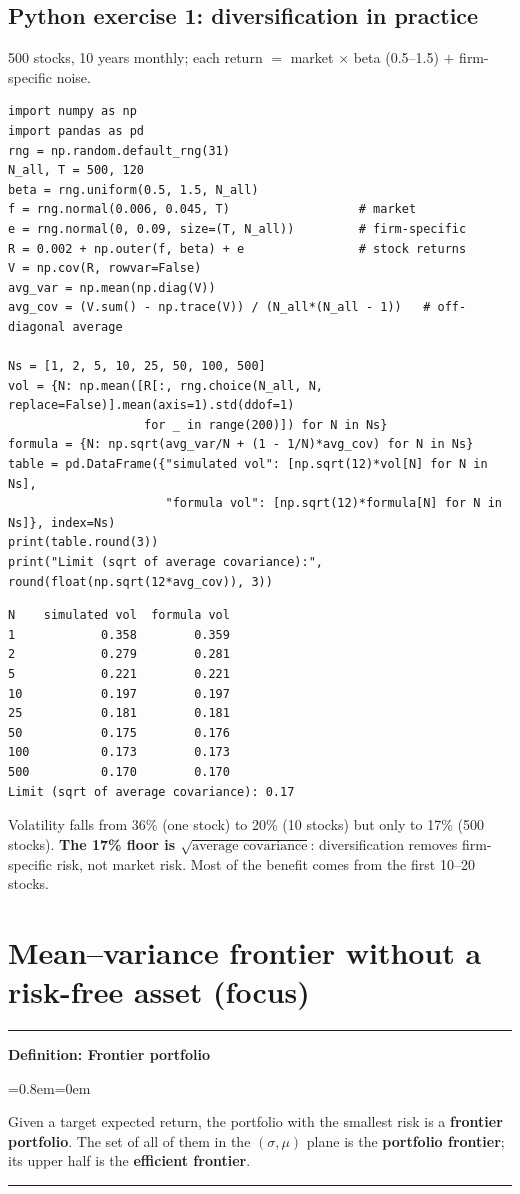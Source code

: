 \documentclass[11pt,a4paper]{report}
\newenvironment{notebox}[1]
  {\par\medskip\Needspace{6\baselineskip}\noindent\rule{\linewidth}{0.4pt}\par\nopagebreak
   \noindent\textbf{#1}\par\nopagebreak
   \begin{list}{}{\leftmargin=0.8em\rightmargin=0em\topsep=2pt}\item[]}
  {\end{list}\nopagebreak\noindent\rule{\linewidth}{0.4pt}\par\medskip}
\newenvironment{definitionbox}[1]{\begin{notebox}{Definition: #1}}{\end{notebox}}
\begin{document}
\subsection*{Python exercise 1: diversification in practice}
500 stocks, 10 years monthly; each return $=$ market $\times$ beta (0.5--1.5) $+$ firm-specific noise.
\begin{lstlisting}
import numpy as np
import pandas as pd
rng = np.random.default_rng(31)
N_all, T = 500, 120
beta = rng.uniform(0.5, 1.5, N_all)
f = rng.normal(0.006, 0.045, T)                  # market
e = rng.normal(0, 0.09, size=(T, N_all))         # firm-specific
R = 0.002 + np.outer(f, beta) + e                # stock returns
V = np.cov(R, rowvar=False)
avg_var = np.mean(np.diag(V))
avg_cov = (V.sum() - np.trace(V)) / (N_all*(N_all - 1))   # off-diagonal average

Ns = [1, 2, 5, 10, 25, 50, 100, 500]
vol = {N: np.mean([R[:, rng.choice(N_all, N, replace=False)].mean(axis=1).std(ddof=1)
                   for _ in range(200)]) for N in Ns}
formula = {N: np.sqrt(avg_var/N + (1 - 1/N)*avg_cov) for N in Ns}
table = pd.DataFrame({"simulated vol": [np.sqrt(12)*vol[N] for N in Ns],
                      "formula vol": [np.sqrt(12)*formula[N] for N in Ns]}, index=Ns)
print(table.round(3))
print("Limit (sqrt of average covariance):", round(float(np.sqrt(12*avg_cov)), 3))
\end{lstlisting}
\begin{lstlisting}[style=out]
N    simulated vol  formula vol
1            0.358        0.359
2            0.279        0.281
5            0.221        0.221
10           0.197        0.197
25           0.181        0.181
50           0.175        0.176
100          0.173        0.173
500          0.170        0.170
Limit (sqrt of average covariance): 0.17
\end{lstlisting}
Volatility falls from 36\% (one stock) to 20\% (10 stocks) but only to 17\% (500
stocks). \textbf{The 17\% floor is $\sqrt{\text{average covariance}}$}:
diversification removes firm-specific risk, not market risk. Most of the benefit
comes from the first 10--20 stocks.

\section{Mean--variance frontier without a risk-free asset (focus)}

\begin{definitionbox}{Frontier portfolio}
Given a target expected return, the portfolio with the smallest risk is a
\textbf{frontier portfolio}. The set of all of them in the $(\sigma,\mu)$ plane
is the \textbf{portfolio frontier}; its upper half is the \textbf{efficient frontier}.
\end{definitionbox}
\end{document}
